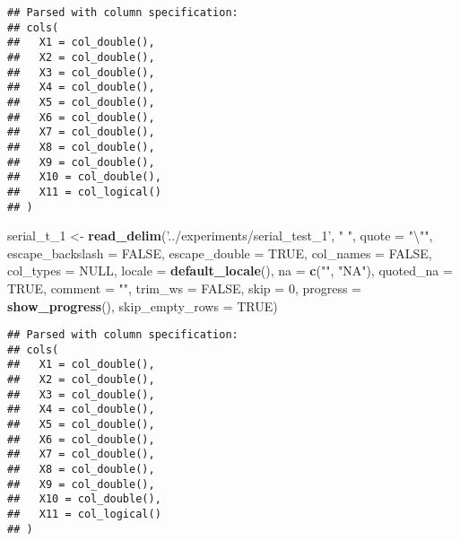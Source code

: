 \documentclass[]{article}
\newenvironment{Shaded}{\begin{snugshade}}{\end{snugshade}}
\newcommand{\KeywordTok}[1]{\textcolor[rgb]{0.13,0.29,0.53}{\textbf{#1}}}
\newcommand{\DataTypeTok}[1]{\textcolor[rgb]{0.13,0.29,0.53}{#1}}
\newcommand{\DecValTok}[1]{\textcolor[rgb]{0.00,0.00,0.81}{#1}}
\newcommand{\CharTok}[1]{\textcolor[rgb]{0.31,0.60,0.02}{#1}}
\newcommand{\StringTok}[1]{\textcolor[rgb]{0.31,0.60,0.02}{#1}}
\newcommand{\OtherTok}[1]{\textcolor[rgb]{0.56,0.35,0.01}{#1}}
\newcommand{\NormalTok}[1]{#1}
\begin{document}
\begin{verbatim}
## Parsed with column specification:
## cols(
##   X1 = col_double(),
##   X2 = col_double(),
##   X3 = col_double(),
##   X4 = col_double(),
##   X5 = col_double(),
##   X6 = col_double(),
##   X7 = col_double(),
##   X8 = col_double(),
##   X9 = col_double(),
##   X10 = col_double(),
##   X11 = col_logical()
## )
\end{verbatim}

\begin{Shaded}
\begin{Highlighting}[]
\NormalTok{serial_t_}\DecValTok{1}\NormalTok{ <-}\StringTok{ }\KeywordTok{read_delim}\NormalTok{(}\StringTok{'../experiments/serial_test_1'}\NormalTok{, }\StringTok{" "}\NormalTok{, }\DataTypeTok{quote =} \StringTok{"}\CharTok{\textbackslash{}"}\StringTok{"}\NormalTok{, }\DataTypeTok{escape_backslash =} \OtherTok{FALSE}\NormalTok{,}
  \DataTypeTok{escape_double =} \OtherTok{TRUE}\NormalTok{, }\DataTypeTok{col_names =} \OtherTok{FALSE}\NormalTok{, }\DataTypeTok{col_types =} \OtherTok{NULL}\NormalTok{,}
  \DataTypeTok{locale =} \KeywordTok{default_locale}\NormalTok{(), }\DataTypeTok{na =} \KeywordTok{c}\NormalTok{(}\StringTok{""}\NormalTok{, }\StringTok{"NA"}\NormalTok{), }\DataTypeTok{quoted_na =} \OtherTok{TRUE}\NormalTok{,}
  \DataTypeTok{comment =} \StringTok{""}\NormalTok{, }\DataTypeTok{trim_ws =} \OtherTok{FALSE}\NormalTok{, }\DataTypeTok{skip =} \DecValTok{0}\NormalTok{, }
 \DataTypeTok{progress =} \KeywordTok{show_progress}\NormalTok{(),}
  \DataTypeTok{skip_empty_rows =} \OtherTok{TRUE}\NormalTok{)}
\end{Highlighting}
\end{Shaded}

\begin{verbatim}
## Parsed with column specification:
## cols(
##   X1 = col_double(),
##   X2 = col_double(),
##   X3 = col_double(),
##   X4 = col_double(),
##   X5 = col_double(),
##   X6 = col_double(),
##   X7 = col_double(),
##   X8 = col_double(),
##   X9 = col_double(),
##   X10 = col_double(),
##   X11 = col_logical()
## )
\end{verbatim}
\end{document}
